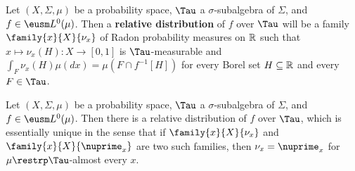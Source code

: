  Let $(X,\Sigma,\mu)$ be a probability space,
$\Tau$ a $\sigma$-subalgebra of $\Sigma$, and
$f\in\eusm L^0(\mu)$.   Then a {\bf relative distribution} of $f$ over
$\Tau$ will be a family $\family{x}{X}{\nu_x}$ of Radon probability
measures on $\Bbb R$ such that $x\mapsto\nu_x(H):X\to[0,1]$ is
$\Tau$-measurable and $\int_F\nu_x(H)\mu(dx)=\mu(F\cap f^{-1}[H])$
for every Borel set $H\subseteq\Bbb R$ and every $F\in\Tau$.

 Let $(X,\Sigma,\mu)$ be a probability space,
$\Tau$ a $\sigma$-subalgebra of $\Sigma$, and $f\in\eusm L^0(\mu)$.
Then there is a relative distribution of $f$ over $\Tau$, which is
essentially unique in the sense that if
$\family{x}{X}{\nu_x}$ and $\family{x}{X}{\nuprime_x}$ are two such
families, then $\nu_x=\nuprime_x$ for $\mu\restrp\Tau$-almost every $x$.

